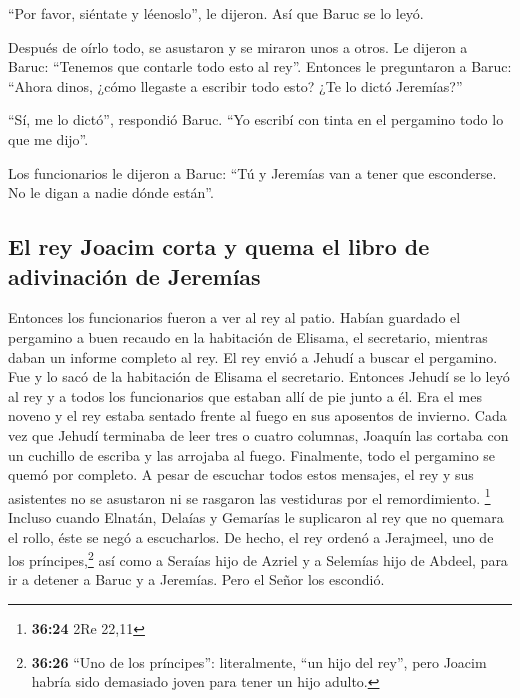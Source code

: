 ``Por favor, siéntate y léenoslo'', le dijeron. Así que
Baruc se lo leyó.

 Después de oírlo todo, se asustaron y se miraron unos a
otros. Le dijeron a Baruc: ``Tenemos que contarle todo esto al rey''.
 Entonces le preguntaron a Baruc: ``Ahora dinos, ¿cómo
llegaste a escribir todo esto? ¿Te lo dictó Jeremías?''

 ``Sí, me lo dictó'', respondió Baruc. ``Yo escribí con
tinta en el pergamino todo lo que me dijo''.

 Los funcionarios le dijeron a Baruc: ``Tú y Jeremías van
a tener que esconderse. No le digan a nadie dónde están''.

\hypertarget{el-rey-joacim-corta-y-quema-el-libro-de-adivinaciuxf3n-de-jeremuxedas}{%
\subsection{El rey Joacim corta y quema el libro de adivinación de
Jeremías}\label{el-rey-joacim-corta-y-quema-el-libro-de-adivinaciuxf3n-de-jeremuxedas}}

 Entonces los funcionarios fueron a ver al rey al patio.
Habían guardado el pergamino a buen recaudo en la habitación de Elisama,
el secretario, mientras daban un informe completo al rey.
 El rey envió a Jehudí a buscar el pergamino. Fue y lo
sacó de la habitación de Elisama el secretario. Entonces Jehudí se lo
leyó al rey y a todos los funcionarios que estaban allí de pie junto a
él.  Era el mes noveno y el rey estaba sentado frente al
fuego en sus aposentos de invierno.  Cada vez que Jehudí
terminaba de leer tres o cuatro columnas, Joaquín las cortaba con un
cuchillo de escriba y las arrojaba al fuego. Finalmente, todo el
pergamino se quemó por completo.  A pesar de escuchar
todos estos mensajes, el rey y sus asistentes no se asustaron ni se
rasgaron las vestiduras por el remordimiento. \footnote{\textbf{36:24}
  2Re 22,11}  Incluso cuando Elnatán, Delaías y Gemarías
le suplicaron al rey que no quemara el rollo, éste se negó a
escucharlos.  De hecho, el rey ordenó a Jerajmeel, uno de
los príncipes,\footnote{\textbf{36:26} ``Uno de los príncipes'':
  literalmente, ``un hijo del rey'', pero Joacim habría sido demasiado
  joven para tener un hijo adulto.} así como a Seraías hijo de Azriel y
a Selemías hijo de Abdeel, para ir a detener a Baruc y a Jeremías. Pero
el Señor los escondió.

